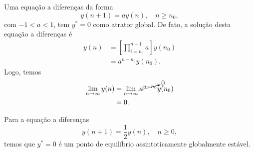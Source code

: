 Uma equação a diferenças da forma
  \begin{equation}
    y(n+1) = ay(n),\quad n\geq n_0,
  \end{equation}
  com $-1<a<1$, tem $y^*=0$ como atrator global. De fato, a solução desta equação a diferenças é
  \begin{align}
    y(n) &= \left[\prod_{i=n_0}^{n-1}a\right]y(n_0) \\
         &= a^{n-n_0}y(n_0).
  \end{align}
  Logo, temos
  \begin{align}
    \lim_{n\to\infty} y(n) &= \lim_{n\to\infty} \cancelto{0}{a^{n-n_0}}y(n_0)\\
                           &= 0.
  \end{align}

\begin{ex}
  Para a equação a diferenças
  \begin{equation}
    y(n+1) = \frac{1}{2}y(n),\quad n\geq 0,
  \end{equation}
  temos que $y^*=0$ é um ponto de equilíbrio assintoticamente globalmente estável.
\end{ex}

